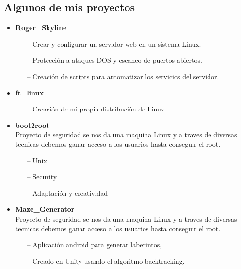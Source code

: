 \documentclass[11pt, oneside, a4paper, titlepage]{article}
\begin{document}
\newpage
{}
\begin{tcolorbox}[breakable,
				title={Adriano Ruiz Barbero \hfill Desarrollador de Software}]
				\section{Algunos de mis proyectos}
				\begin{itemize}
				\item
				{
					\textbf{Roger\_Skyline}
					\begin{enumerate}
						\item[--] Crear y configurar un servidor web en un sistema Linux.
						\item[--] Protección a ataques DOS y escaneo de puertos abiertos.
						\item[--] Creación de scripts para automatizar los servicios del servidor.
					\end{enumerate}
				}
				\item
				{
					\textbf{ft\_linux}
					\begin{enumerate}
						\item[--] Creación de mi propia distribución de Linux
					\end{enumerate}
				}
				\item
				{
					\textbf{boot2root} \\
					Proyecto de seguridad se nos da una maquina
					Linux y a traves de diversas tecnicas debemos
					ganar acceso a los usuarios hasta conseguir el
					root.
					\begin{enumerate}
						\item[--] Unix 
						\item[--] Security
						\item[--] Adaptación y creatividad
					\end{enumerate}
				}
				\item
				{
					\textbf{Maze\_Generator} \\
					Proyecto de seguridad se nos da una maquina
					Linux y a traves de diversas tecnicas debemos
					ganar acceso a los usuarios hasta conseguir el
					root.
					\begin{enumerate}
						\item[--]Aplicación android para
							generar laberintos, 
						\item[--]Creado en Unity usando el algoritmo
							backtracking.

					\end{enumerate}
				}
				\end{itemize}
\end{tcolorbox}
\end{document}
